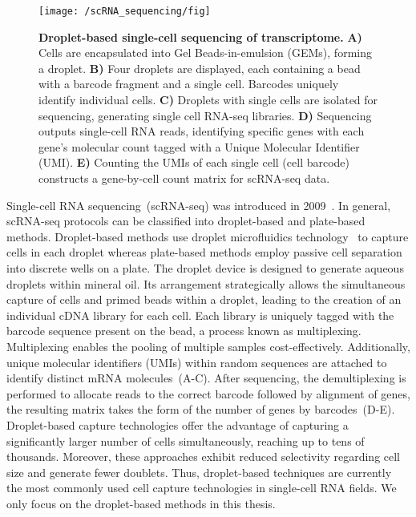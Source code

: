 \begin{figure}[!ht]
	\centering
	\texttt{[image: /scRNA\_sequencing/fig]}
	\vspace{0.1cm}
	\caption[Droplet-based single-cell sequencing of transcriptome.]{\textbf{Droplet-based single-cell sequencing of transcriptome.} \textbf{A)} Cells are encapsulated into Gel Beads-in-emulsion (GEMs), forming a droplet. \textbf{B)} Four droplets are displayed, each containing a bead with a barcode fragment and a single cell. Barcodes uniquely identify individual cells. \textbf{C)} Droplets with single cells are isolated for sequencing, generating single cell RNA-seq libraries. \textbf{D)} Sequencing outputs single-cell RNA reads, identifying specific genes with each gene's molecular count tagged with a Unique Molecular Identifier (UMI). \textbf{E)} Counting the UMIs of each single cell (cell barcode) constructs a gene-by-cell count matrix for scRNA-seq data.}
	\label{fig:scRNA_to_count_matrix}
\end{figure}


Single-cell RNA sequencing~(scRNA-seq) was introduced in 2009~\citep{tang2009mrna}. In general, scRNA-seq protocols can be classified into droplet-based and plate-based methods. Droplet-based methods use droplet microfluidics technology~\citep{dropletcompare2019, droplet2019practice} to capture cells in each droplet whereas plate-based methods employ passive cell separation into discrete wells on a plate. The droplet device is designed to generate aqueous droplets within mineral oil. Its arrangement strategically allows the simultaneous capture of cells and primed beads within a droplet, leading to the creation of an individual cDNA library for each cell. Each library is uniquely tagged with the barcode sequence present on the bead, a process known as multiplexing. Multiplexing enables the pooling of multiple samples cost-effectively. Additionally, unique molecular identifiers (UMIs) within random sequences are attached to identify distinct mRNA molecules~(A-C). After sequencing, the demultiplexing is performed to allocate reads to the correct barcode followed by alignment of genes, the resulting matrix takes the form of the number of genes by barcodes~(D-E). Droplet-based capture technologies offer the advantage of capturing a significantly larger number of cells simultaneously, reaching up to tens of thousands. Moreover, these approaches exhibit reduced selectivity regarding cell size and generate fewer doublets. Thus, droplet-based techniques are currently the most commonly used cell capture technologies in single-cell RNA fields. We only focus on the droplet-based methods in this thesis.



